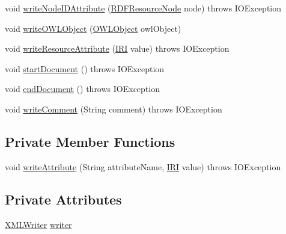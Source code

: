 \begin{DoxyCompactItemize}
\item 
void \hyperlink{classorg_1_1coode_1_1owlapi_1_1rdf_1_1rdfxml_1_1_r_d_f_x_m_l_writer_a37e39844f952d3277ef1dff6c1a6d3f0}{write\-Node\-I\-D\-Attribute} (\hyperlink{classorg_1_1coode_1_1owlapi_1_1rdf_1_1model_1_1_r_d_f_resource_node}{R\-D\-F\-Resource\-Node} node)  throws I\-O\-Exception  
\item 
void \hyperlink{classorg_1_1coode_1_1owlapi_1_1rdf_1_1rdfxml_1_1_r_d_f_x_m_l_writer_a20ba40cc8c77f895e314277e212354d6}{write\-O\-W\-L\-Object} (\hyperlink{interfaceorg_1_1semanticweb_1_1owlapi_1_1model_1_1_o_w_l_object}{O\-W\-L\-Object} owl\-Object)
\item 
void \hyperlink{classorg_1_1coode_1_1owlapi_1_1rdf_1_1rdfxml_1_1_r_d_f_x_m_l_writer_a23cb7bdb86aeb860510b950f1f8da1bf}{write\-Resource\-Attribute} (\hyperlink{classorg_1_1semanticweb_1_1owlapi_1_1model_1_1_i_r_i}{I\-R\-I} value)  throws I\-O\-Exception  
\item 
void \hyperlink{classorg_1_1coode_1_1owlapi_1_1rdf_1_1rdfxml_1_1_r_d_f_x_m_l_writer_ac0de8c68cfe978b9b8488287958425d4}{start\-Document} ()  throws I\-O\-Exception  
\item 
void \hyperlink{classorg_1_1coode_1_1owlapi_1_1rdf_1_1rdfxml_1_1_r_d_f_x_m_l_writer_afd165cb79373dc90f75006fb373a45c9}{end\-Document} ()  throws I\-O\-Exception  
\item 
void \hyperlink{classorg_1_1coode_1_1owlapi_1_1rdf_1_1rdfxml_1_1_r_d_f_x_m_l_writer_a18538fadea59e8516de3be3dfadcbbfb}{write\-Comment} (String comment)  throws I\-O\-Exception  
\end{DoxyCompactItemize}
\subsection*{Private Member Functions}
\begin{DoxyCompactItemize}
\item 
void \hyperlink{classorg_1_1coode_1_1owlapi_1_1rdf_1_1rdfxml_1_1_r_d_f_x_m_l_writer_abe48facd3cf1f16e5ccc7504bdeabc06}{write\-Attribute} (String attribute\-Name, \hyperlink{classorg_1_1semanticweb_1_1owlapi_1_1model_1_1_i_r_i}{I\-R\-I} value)  throws I\-O\-Exception  
\end{DoxyCompactItemize}
\subsection*{Private Attributes}
\begin{DoxyCompactItemize}
\item 
\hyperlink{interfaceorg_1_1coode_1_1xml_1_1_x_m_l_writer}{X\-M\-L\-Writer} \hyperlink{classorg_1_1coode_1_1owlapi_1_1rdf_1_1rdfxml_1_1_r_d_f_x_m_l_writer_adeeb9f20ac67e477f3578e9c52c0f1a3}{writer}
\end{DoxyCompactItemize}


